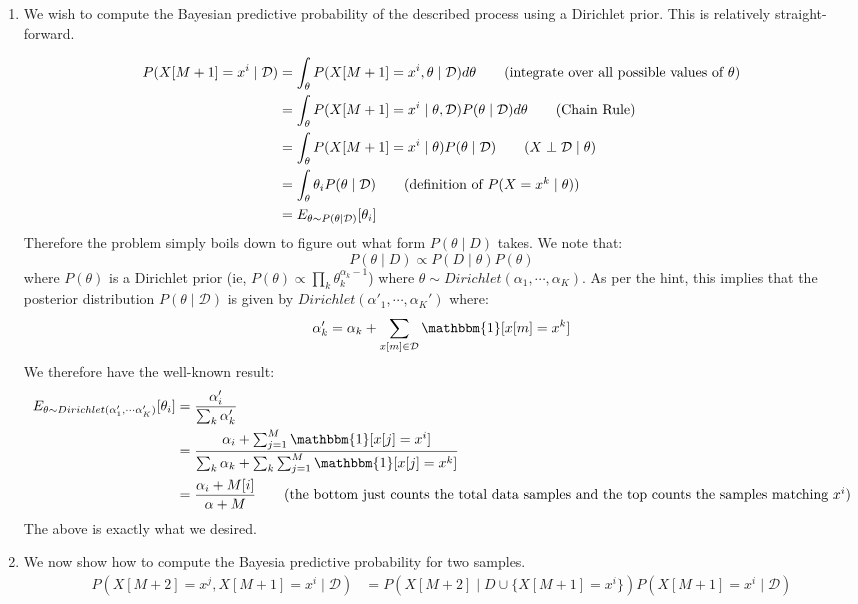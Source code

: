 \documentclass[12pt]{article}
\begin{document}
\begin{enumerate}[label=(\alph*)]
  \item We wish to compute the Bayesian predictive probability of the described process using a Dirichlet prior. This is relatively straight-forward.

  \begin{align*}
  	P(X[M+1] = x^i \mid \mathcal{D}) &= \int_\theta P(X[M+1] = x^i, \theta \mid \mathcal D)d\theta \tag{integrate over all possible values of $\theta$} \\
  	&= \int_\theta P(X[M+1] = x^i \mid \theta, \mathcal{D})P(\theta \mid \mathcal{D}) d\theta \tag{Chain Rule} \\
  	&= \int_\theta P(X[M+1] = x^i \mid \theta)P(\theta \mid \mathcal{D}) \tag{$X \perp \mathcal{D} \mid \theta$} \\
  	&= \int_\theta \theta_i P(\theta \mid \mathcal{D}) \tag{definition of $P(X=x^k \mid \theta)$}\\
  	&= E_{\theta \sim P(\theta \mid \mathcal{D})}[\theta_i] 
  \end{align*}
  Therefore the problem simply boils down to figure out what form $P(\theta \mid D)$ takes. We note that:
  $$
  	P(\theta \mid D) \propto P(D \mid \theta) P(\theta)
  $$
  where $P(\theta)$ is a Dirichlet prior (ie, $P(\theta) \propto \prod_k \theta_k^{\alpha_k - 1}$) where $\theta \sim Dirichlet(\alpha_1, \cdots, \alpha_K)$. As per the hint, this implies that the posterior distribution $P(\theta \mid \mathcal{D})$ is given by $Dirichlet(\alpha'_1,\cdots,\alpha_K')$ where:
  $$
  	\alpha_k' = \alpha_k + \sum_{x[m] \in \mathcal{D}} \mathbbm{1}[x[m] = x^k]
  $$
  We therefore have the well-known result:
  \begin{align*}
  	E_{\theta \sim Dirichlet(\alpha_1', \cdots \alpha'_K)}[\theta_i] &= \frac{\alpha'_i}{\sum_k \alpha'_k} \\
  	&= \frac{\alpha_i + \sum_{j=1}^M \mathbbm{1}[x[j] = x^i]}{\sum_k \alpha_k + \sum_k \sum_{j=1}^M \mathbbm{1}[x[j] = x^k]} \\
  	&= \frac{\alpha_i + M[i]}{\alpha + M} \tag{the bottom just counts the total data samples and the top counts the samples matching $x^i$}
  \end{align*}
  The above is exactly what we desired.
  \item We now show how to compute the Bayesia predictive probability for two samples.
  \begin{align*}
  	P(X[M + 2] = x^j, X[M+1] = x^i \mid \mathcal{D}) &= P(X[M+2] \mid D \cup \{X[M+1] = x^i \})P(X[M+1] = x^i \mid \mathcal{D}) \tag{Chain rule where we consider $X[M+1]$ to just be another sample in our dataset} \\

\end{align*}
\end{enumerate}
\end{document}
